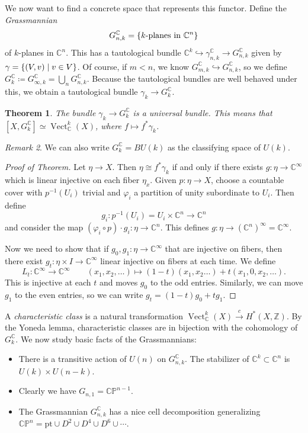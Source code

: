 \documentclass[leqno, openany]{memoir}
\newtheorem{thm}{Theorem}[section]
\theoremstyle{definition}
\theoremstyle{remark}
\newtheorem{rmk}[thm]{Remark}
\theoremstyle{plain}
\theoremstyle{definition}
\theoremstyle{remark}
\newcommand{\C}{\mathbb{C}}
\newcommand{\Z}{\mathbb{Z}}
\renewcommand{\P}{\mathbb{P}}
\newcommand{\mr}[1]{\mathrm{#1}}
\DeclareMathOperator{\Vect}{Vect}
\begin{document}
We now want to find a concrete space that represents this functor. Define the \textit{Grassmannian}
\[ G_{n, k}^{\C} = \qty{k\text{-planes in }\C^n} \]
of $k$-planes in $\C^n$. This has a tautological bundle $\C^k \hookrightarrow \gamma_{n, k}^{\C} \to G_{n,k}^{\C}$ given by $\gamma = \qty{(V, v) \mid v \in V}$. Of course, if $m < n$, we know $G_{m,k}^{\C} \hookrightarrow G_{n,k}^{\C}$, so we define $G_k^{\C} \coloneqq G_{\infty,k}^{\C} = \bigcup_n G_{n,k}^{\C}$. Because the tautological bundles are well behaved under this, we obtain a tautological bundle $\gamma_k \to G_k^{\C}$.

\begin{thm}
    The bundle $\gamma_k \to G_k^{\C}$ is a universal bundle. This means that $[X, G_k^{\C}] \simeq \Vect_{\C}^k(X)$, where $f \mapsto f^* \gamma_k$.
\end{thm}

\begin{rmk}
    We can also write $G_k^{\C} = BU(k)$ as the classifying space of $U(k)$.
\end{rmk}

\begin{proof}[Proof of Theorem]
    Let $\eta \to X$. Then $\eta \cong f^* \gamma_k$ if and only if there exists $g \colon \eta \to \C^{\infty}$ which is linear injective on each fiber $\eta_x$. Given $p \colon \eta \to X$, choose a countable cover with $p^{-1}(U_i)$ trivial and $\varphi_i$ a partition of unity subordinate to $U_i$. Then define
    \[ g_i \colon p^{-1}(U_i) = U_i \times \C^n \to \C^n \]
    and consider the map $(\varphi_i \circ p) \cdot g_i \colon \eta \to \C^n$. This defines $g \colon \eta \to {(\C^n)}^{\infty} = \C^{\infty}$.

    Now we need to show that if $g_0, g_1 \colon \eta \to \C^{\infty}$ that are injective on fibers, then there exist $g_t \colon \eta \times I \to \C^{\infty}$ linear injective on fibers at each time. We define
    \[ L_t \colon \C^{\infty} \to \C^{\infty} \qquad (x_1, x_2, \ldots) \mapsto (1-t)(x_1, x_2 \ldots) + t (x_1, 0, x_2, \ldots). \]
    This is injective at each $t$ and moves $g_0$ to the odd entries. Similarly, we can move $g_1$ to the even entries, so we can write $g_t = (1-t) g_0 + t g_1$.
\end{proof}

A \textit{characteristic class} is a natural transformation $\Vect_{\C}^k (X) \xrightarrow{c} H^*(X, \Z)$. By the Yoneda lemma, characteristic classes are in bijection with the cohomology of $G_k^{\C}$. We now study basic facts of the Grassmannians:
\begin{itemize}
    \item There is a transitive action of $U(n)$ on $G_{n,k}^{\C}$. The stabilizer of $\C^k \subset \C^n$ is $U(k) \times U(n-k)$.
    \item Clearly we have $G_{n,1} = \C\P^{n-1}$.
    \item The Grassmannian $G_{n,k}^{\C}$ has a nice cell decomposition generalizing $\C\P^n = \mr{pt} \cup D^2 \cup D^4 \cup D^6 \cup \cdots$.
\end{itemize}
\end{document}
